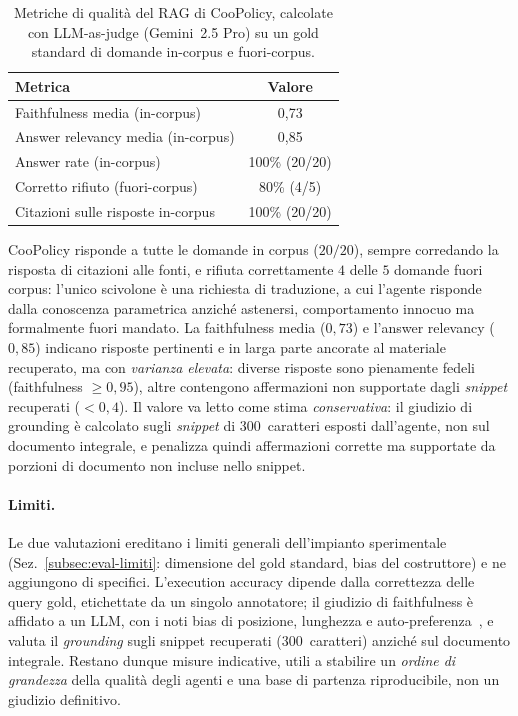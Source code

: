 \begin{table}[htbp]
  \centering
  \caption[Metriche RAG di CooPolicy]{Metriche di qualità del RAG di CooPolicy, calcolate con LLM-as-judge (Gemini~2.5 Pro) su un gold standard di domande in-corpus e fuori-corpus.}
  \label{tab:eval-rag}
  \begin{tabular}{lc}
    \toprule
    \textbf{Metrica} & \textbf{Valore} \\
    \midrule
    Faithfulness media (in-corpus)              & 0{,}73 \\
    Answer relevancy media (in-corpus)          & 0{,}85 \\
    Answer rate (in-corpus)                     & 100\% (20/20) \\
    Corretto rifiuto (fuori-corpus)             & 80\% (4/5) \\
    Citazioni sulle risposte in-corpus          & 100\% (20/20) \\
    \bottomrule
  \end{tabular}
\end{table}

CooPolicy risponde a tutte le domande in corpus ($20/20$), sempre corredando la risposta di citazioni alle fonti, 
e rifiuta correttamente $4$ delle $5$ domande fuori corpus: l'unico scivolone è una richiesta di traduzione, 
a cui l'agente risponde dalla conoscenza parametrica anziché astenersi, comportamento innocuo ma formalmente fuori mandato. 
La faithfulness media ($0{,}73$) e l'answer relevancy ($0{,}85$) indicano risposte pertinenti e in larga parte ancorate al materiale recuperato, 
ma con \emph{varianza elevata}: diverse risposte sono pienamente fedeli (faithfulness $\geq 0{,}95$), 
altre contengono affermazioni non supportate dagli \emph{snippet} recuperati ($< 0{,}4$). 
Il valore va letto come stima \emph{conservativa}: il giudizio di grounding è calcolato sugli \emph{snippet} di 300~caratteri esposti dall'agente, 
non sul documento integrale, e penalizza quindi affermazioni corrette ma supportate da porzioni di documento non incluse nello snippet.

\paragraph{Limiti.} Le due valutazioni ereditano i limiti generali dell'impianto sperimentale (Sez.~\ref{subsec:eval-limiti}: dimensione del gold standard, bias del costruttore) e ne aggiungono di specifici.
L'execution accuracy dipende dalla correttezza delle query gold, etichettate da un singolo annotatore; il giudizio di faithfulness è affidato a un LLM, 
con i noti bias di posizione, lunghezza e auto-preferenza~\cite{zheng2023llmjudge}, e valuta il \emph{grounding} sugli snippet recuperati (300~caratteri) 
anziché sul documento integrale. Restano dunque misure indicative, utili a stabilire un \emph{ordine di grandezza} della qualità degli agenti e una base di partenza riproducibile, 
non un giudizio definitivo.

